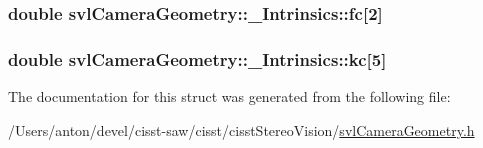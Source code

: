 \subsubsection[{fc}]{\setlength{\rightskip}{0pt plus 5cm}double svl\+Camera\+Geometry\+::\+\_\+\+Intrinsics\+::fc\mbox{[}2\mbox{]}}\label{structsvl_camera_geometry_1_1___intrinsics_a2f1e1affb6703fb2de4ab27422945147}
\hypertarget{structsvl_camera_geometry_1_1___intrinsics_ac898a7e5d9a1062d6073288b38e91492}{}
\subsubsection[{kc}]{\setlength{\rightskip}{0pt plus 5cm}double svl\+Camera\+Geometry\+::\+\_\+\+Intrinsics\+::kc\mbox{[}5\mbox{]}}\label{structsvl_camera_geometry_1_1___intrinsics_ac898a7e5d9a1062d6073288b38e91492}


The documentation for this struct was generated from the following file\+:\begin{DoxyCompactItemize}
\item 
/\+Users/anton/devel/cisst-\/saw/cisst/cisst\+Stereo\+Vision/\hyperlink{svl_camera_geometry_8h}{svl\+Camera\+Geometry.\+h}\end{DoxyCompactItemize}

